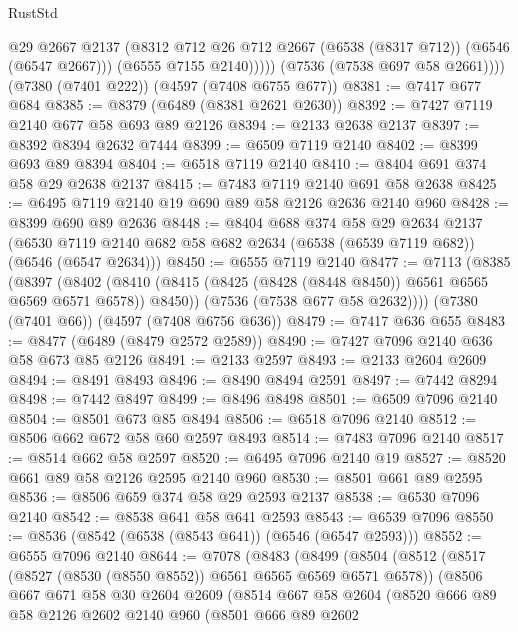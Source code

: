 \begin{lexlean}{RustStd}
\begin{coremodule}
                @29
                @2667
                @2137
                (@8312 @712 @26 @712 @2667 (@6538 (@8317 @712)) (@6546 (@6547 @2667)))
                (@6555 @7155 @2140)))))
        (@7536 (@7538 @697 @58 @2661))))
    (@7380 (@7401 @222))
    (@4597 (@7408 @6755 @677))
@8381 := @7417 @677 @684
@8385 := @8379 (@6489 (@8381 @2621 @2630))
@8392 := @7427 @7119 @2140 @677 @58 @693 @89 @2126
@8394 := @2133 @2638 @2137
@8397 := @8392 @8394 @2632 @7444
@8399 := @6509 @7119 @2140
@8402 := @8399 @693 @89 @8394
@8404 := @6518 @7119 @2140
@8410 := @8404 @691 @374 @58 @29 @2638 @2137
@8415 := @7483 @7119 @2140 @691 @58 @2638
@8425 := @6495 @7119 @2140 @19 @690 @89 @58 @2126 @2636 @2140 @960
@8428 := @8399 @690 @89 @2636
@8448 := @8404
    @688
    @374
    @58
    @29
    @2634
    @2137
    (@6530 @7119 @2140 @682 @58 @682 @2634 (@6538 (@6539 @7119 @682)) (@6546 (@6547 @2634)))
@8450 := @6555 @7119 @2140
@8477 := @7113
    (@8385
      (@8397
        (@8402 (@8410 (@8415 (@8425 (@8428 (@8448 @8450)) @6561 @6565 @6569 @6571 @6578)) @8450))
        (@7536 (@7538 @677 @58 @2632))))
    (@7380 (@7401 @66))
    (@4597 (@7408 @6756 @636))
@8479 := @7417 @636 @655
@8483 := @8477 (@6489 (@8479 @2572 @2589))
@8490 := @7427 @7096 @2140 @636 @58 @673 @85 @2126
@8491 := @2133 @2597
@8493 := @2133 @2604 @2609
@8494 := @8491 @8493
@8496 := @8490 @8494 @2591
@8497 := @7442 @8294
@8498 := @7442 @8497
@8499 := @8496 @8498
@8501 := @6509 @7096 @2140
@8504 := @8501 @673 @85 @8494
@8506 := @6518 @7096 @2140
@8512 := @8506 @662 @672 @58 @60 @2597 @8493
@8514 := @7483 @7096 @2140
@8517 := @8514 @662 @58 @2597
@8520 := @6495 @7096 @2140 @19
@8527 := @8520 @661 @89 @58 @2126 @2595 @2140 @960
@8530 := @8501 @661 @89 @2595
@8536 := @8506 @659 @374 @58 @29 @2593 @2137
@8538 := @6530 @7096 @2140
@8542 := @8538 @641 @58 @641 @2593
@8543 := @6539 @7096
@8550 := @8536 (@8542 (@6538 (@8543 @641)) (@6546 (@6547 @2593)))
@8552 := @6555 @7096 @2140
@8644 := @7078
    (@8483
      (@8499
        (@8504
          (@8512
            (@8517 (@8527 (@8530 (@8550 @8552)) @6561 @6565 @6569 @6571 @6578))
            (@8506
              @667
              @671
              @58
              @30
              @2604
              @2609
              (@8514
                @667
                @58
                @2604
                (@8520
                  @666
                  @89
                  @58
                  @2126
                  @2602
                  @2140
                  @960
                  (@8501
                    @666
                    @89
                    @2602

\end{coremodule}
\end{lexlean}

